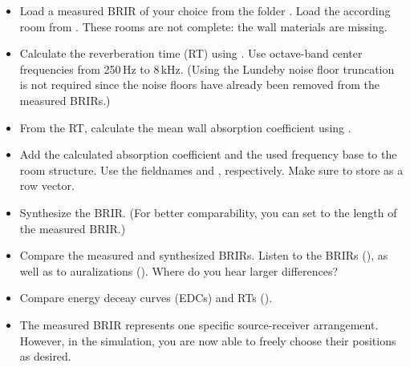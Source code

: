 \documentclass[a4paper, fleqn, 11pt]{article}
\begin{document}
\begin{itemize}
  \item Load a measured BRIR of your choice from the folder . Load the according room from . These rooms are not complete: the wall materials are missing.
  \item Calculate the reverberation time (RT) using . Use octave-band center frequencies from 250\,Hz to 8\,kHz. (Using the Lundeby noise floor truncation is not required since the noise floors have already been removed from the measured BRIRs.)
  \item From the RT, calculate the mean wall absorption coefficient using .
  \item Add the calculated absorption coefficient and the used frequency base to the room structure. Use the fieldnames  and , respectively. Make sure to store  as a row vector.
  \item Synthesize the BRIR. (For better comparability, you can set  to the length of the measured BRIR.)
  \item Compare the measured and synthesized BRIRs. Listen to the BRIRs (), as well as to auralizations (). Where do you hear larger differences?
  \item Compare energy deceay curves (EDCs) and RTs ().
  \item The measured BRIR represents one specific source-receiver arrangement. However, in the simulation, you are now able to freely choose their positions as desired.
\end{itemize}

\end{document}
